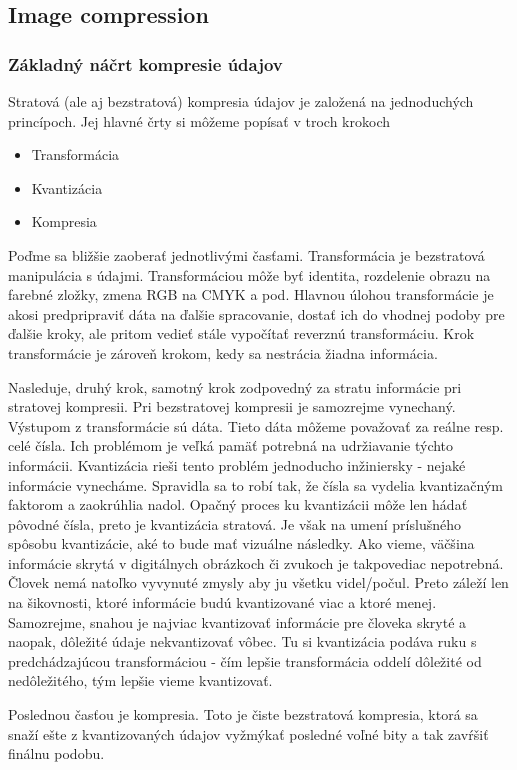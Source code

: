 \subsection{Image compression}

\subsubsection{Základný náčrt kompresie údajov}
Stratová (ale aj bezstratová) kompresia údajov je založená na
jednoduchých princípoch. Jej hlavné črty si môžeme popísať v troch
krokoch
\begin{itemize}
\item Transformácia
\item Kvantizácia
\item Kompresia
\end{itemize}
Poďme sa bližšie zaoberať jednotlivými časťami.
Transformácia je bezstratová manipulácia s údajmi. Transformáciou môže
byť identita, rozdelenie obrazu na farebné zložky, zmena RGB na CMYK a
pod. Hlavnou úlohou transformácie je akosi predpripraviť dáta na
ďalšie spracovanie, dostať ich do vhodnej podoby pre ďalšie kroky, ale
pritom vedieť stále vypočítať reverznú transformáciu. Krok
transformácie je zároveň krokom, kedy sa nestrácia žiadna informácia.

Nasleduje, druhý krok, samotný krok zodpovedný za stratu informácie
pri stratovej kompresii. Pri bezstratovej kompresii je samozrejme
vynechaný. Výstupom z transformácie sú dáta. Tieto dáta môžeme
považovať za reálne resp. celé čísla. Ich problémom je veľká pamäť
potrebná na udržiavanie týchto informácii. Kvantizácia rieši tento
problém jednoducho inžiniersky - nejaké informácie vynecháme.
Spravidla sa to robí tak, že čísla sa vydelia kvantizačným faktorom a
zaokrúhlia nadol. Opačný proces ku kvantizácii môže len hádať pôvodné
čísla, preto je kvantizácia stratová. Je však na umení príslušného
spôsobu kvantizácie, aké to bude mať vizuálne následky. Ako vieme,
väčšina informácie skrytá v digitálnych obrázkoch či zvukoch je
takpovediac nepotrebná. Človek nemá natoľko vyvynuté zmysly aby ju
všetku videl/počul. Preto záleží len na šikovnosti, ktoré informácie
budú kvantizované viac a ktoré menej. Samozrejme, snahou je najviac
kvantizovať informácie pre človeka skryté a naopak, dôležité údaje
nekvantizovať vôbec. Tu si kvantizácia podáva ruku s predchádzajúcou
transformáciou - čím lepšie transformácia oddelí dôležité od
nedôležitého, tým lepšie vieme kvantizovať.

Poslednou časťou je kompresia. Toto je čiste bezstratová kompresia,
ktorá sa snaží ešte z kvantizovaných údajov vyžmýkať posledné voľné
bity a tak zavŕšiť finálnu podobu.

